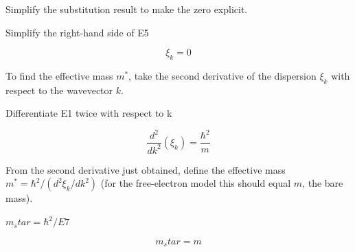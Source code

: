 \documentclass[dvipdfmx]{article}
\begin{document}
Simplify the substitution result to make the zero explicit.

Simplify the right-hand side of E5

\begin{equation}
  \xi_k = 0
  \label{eq:E6}
\end{equation}

To find the effective mass $m^*$, take the second derivative of the dispersion $\xi_k$ with respect to the wavevector $k$.

Differentiate E1 twice with respect to k

\begin{equation}
  \frac{d^{2}}{dk^{2}}\left(\xi_k\right) = \frac{\hbar^{2}}{m}
  \label{eq:E7}
\end{equation}

From the second derivative just obtained, define the effective mass $m^*=\hbar^2/(d^2\xi_k/dk^2)$ (for the free-electron model this should equal $m$, the bare mass).

$m_star = \hbar^2 / E7$

\begin{equation}
  m_star = m
  \label{eq:E8}
\end{equation}
\end{document}
